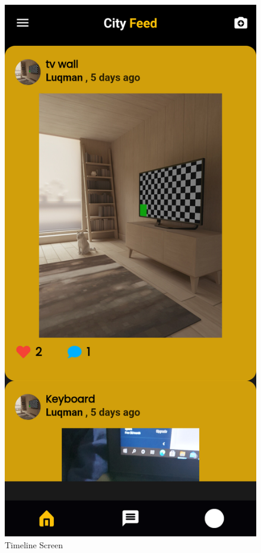 \begin{figure}[H]
    \centering
    \includegraphics[scale=0.10]{App Screenshots/Timeline Page.png}
    \caption{Timeline Screen}
    \label{fig:Timeline Screen}
\end{figure}
